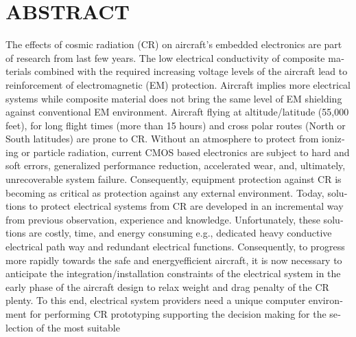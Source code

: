 %
\chapter*{ABSTRACT}\thispagestyle{headings}
%
\begin{otherlanguage}{english}
The   effects   of   cosmic   radiation   (CR)   on   aircraft’s   embedded   electronics   are   part   of   research   from   last  
few   years. The   low   electrical   conductivity   of   composite   materials   combined   with   the   required  
increasing   voltage   levels   of   the   aircraft   lead   to   reinforcement   of   electromagnetic   (EM)   protection.  
Aircraft   implies   more   electrical   systems   while   composite   material   does   not   bring   the   same   level   of   EM  
shielding   against   conventional   EM   environment.   Aircraft   flying   at   altitude/latitude   (55,000   feet),   for  
long   flight   times   (more   than   15   hours)   and   cross   polar   routes   (North   or   South   latitudes)   are   prone   to  
CR.   Without   an   atmosphere   to   protect   from   ionizing   or   particle   radiation,   current   CMOS ­based  
electronics   are   subject   to   hard and soft errors,   generalized   performance   reduction,   accelerated   wear,   and,  
ultimately,   unrecoverable   system   failure.   Consequently,   equipment   protection   against   CR   is   becoming  
as   critical   as   protection   against   any   external   environment. Today,   solutions   to   protect   electrical   systems  
from   CR   are   developed   in   an   incremental   way   from   previous   observation,   experience   and   knowledge.  
Unfortunately,   these   solutions   are   costly,   time,   and   energy   consuming   e.g.,   dedicated   heavy   conductive  
electrical   path   way   and   redundant   electrical   functions.   Consequently,   to   progress   more   rapidly   towards  
the   safe   and   energy­efficient   aircraft,   it   is   now   necessary   to   anticipate   the   integration/installation  
constraints   of   the   electrical   system   in   the   early   phase   of   the   aircraft   design   to   relax   weight   and   drag  
penalty   of   the   CR   plenty.   To   this   end,   electrical   system   providers   need   a   unique   computer   environment  
for   performing   CR   prototyping   supporting   the   decision ­making   for   the   selection   of   the   most   suitable  

\end{otherlanguage}
